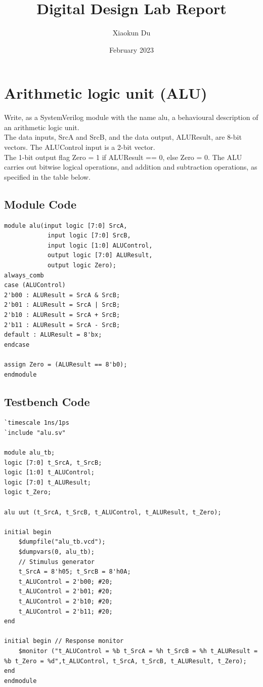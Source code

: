 \documentclass{article}
\title{Digital Design Lab Report}
\author{Xiaokun Du}
\date{February 2023}
\begin{document}
\maketitle


\section{Arithmetic logic unit (ALU)}

Write, as a SystemVerilog module with the name alu, a behavioural description of an arithmetic logic unit. \\
The data inputs, SrcA and SrcB, and the data output, ALUResult, are 8-bit vectors. The ALUControl input is a 2-bit vector. \\
The 1-bit output flag Zero = 1 if ALUResult == 0, else Zero = 0. The ALU carries out bitwise logical operations, and addition and subtraction operations, as specified in the table below.
\subsection{Module Code}
\begin{lstlisting}
module alu(input logic [7:0] SrcA,
            input logic [7:0] SrcB,
            input logic [1:0] ALUControl,
            output logic [7:0] ALUResult,
            output logic Zero);
always_comb
case (ALUControl)
2'b00 : ALUResult = SrcA & SrcB;
2'b01 : ALUResult = SrcA | SrcB;
2'b10 : ALUResult = SrcA + SrcB;
2'b11 : ALUResult = SrcA - SrcB;
default : ALUResult = 8'bx;
endcase

assign Zero = (ALUResult == 8'b0);
endmodule
\end{lstlisting}

\subsection{Testbench Code}
\begin{lstlisting}
`timescale 1ns/1ps 
`include "alu.sv"

module alu_tb;
logic [7:0] t_SrcA, t_SrcB;
logic [1:0] t_ALUControl;
logic [7:0] t_ALUResult;
logic t_Zero;

alu uut (t_SrcA, t_SrcB, t_ALUControl, t_ALUResult, t_Zero);

initial begin
    $dumpfile("alu_tb.vcd"); 
    $dumpvars(0, alu_tb);
    // Stimulus generator
    t_SrcA = 8'h05; t_SrcB = 8'h0A;
    t_ALUControl = 2'b00; #20;
    t_ALUControl = 2'b01; #20;
    t_ALUControl = 2'b10; #20;
    t_ALUControl = 2'b11; #20;
end

initial begin // Response monitor
    $monitor ("t_ALUControl = %b t_SrcA = %h t_SrcB = %h t_ALUResult = %b t_Zero = %d",t_ALUControl, t_SrcA, t_SrcB, t_ALUResult, t_Zero);
end
endmodule

\end{lstlisting}
\end{document}
